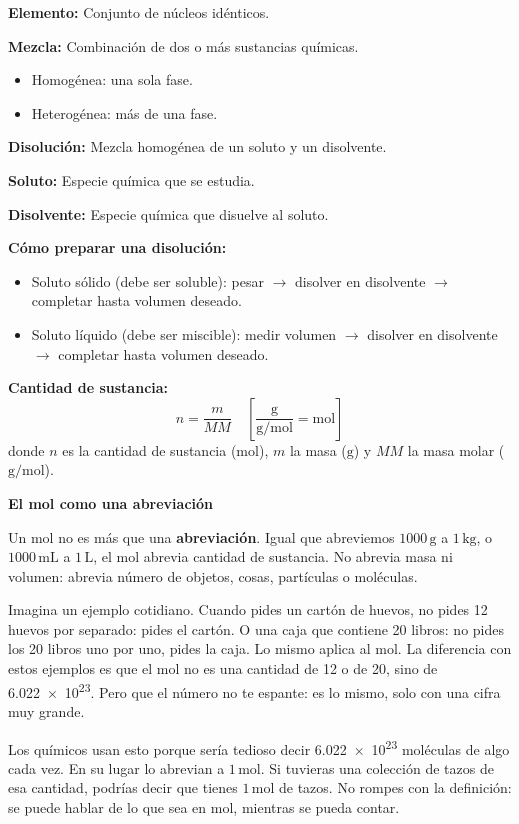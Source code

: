 \textbf{Elemento:} Conjunto de núcleos idénticos.

\textbf{Mezcla:} Combinación de dos o más sustancias químicas.
\begin{itemize}
    \item Homogénea: una sola fase.
    \item Heterogénea: más de una fase.
\end{itemize}

\textbf{Disolución:} Mezcla homogénea de un soluto y un disolvente.

\textbf{Soluto:} Especie química que se estudia.

\textbf{Disolvente:} Especie química que disuelve al soluto.

\textbf{Cómo preparar una disolución:}
\begin{itemize}
    \item Soluto sólido (debe ser soluble): pesar $\to$ disolver en disolvente $\to$ completar hasta volumen deseado.
    \item Soluto líquido (debe ser miscible): medir volumen $\to$ disolver en disolvente $\to$ completar hasta volumen deseado.
\end{itemize}

\textbf{Cantidad de sustancia:}
\begin{equation}
    n = \frac{m}{MM}
    \quad \left[\frac{\mathrm{g}}{\mathrm{g/mol}} = \mathrm{mol}\right]
\end{equation}
donde $n$ es la cantidad de sustancia ($\mathrm{mol}$), $m$ la masa ($\mathrm{g}$) y $MM$ la masa molar ($\mathrm{g/mol}$).

\textbf{El mol como una abreviación}

Un mol no es más que una \textbf{abreviación}. Igual que abreviemos 
$1000\,\mathrm{g}$ a $1\,\mathrm{kg}$, o $1000\,\mathrm{mL}$ a $1\,\mathrm{L}$, 
el mol abrevia cantidad de sustancia. No abrevia masa ni volumen: abrevia 
número de objetos, cosas, partículas o moléculas.

Imagina un ejemplo cotidiano. Cuando pides un cartón de huevos, no pides 12 
huevos por separado: pides el cartón. O una caja que contiene 20 libros: no 
pides los 20 libros uno por uno, pides la caja. Lo mismo aplica al mol. La 
diferencia con estos ejemplos es que el mol no es una cantidad de 12 o de 20, 
sino de \num{6.022e23}. Pero que el número no te espante: es lo mismo, 
solo con una cifra muy grande.

Los químicos usan esto porque sería tedioso decir \num{6.022e23} 
moléculas de algo cada vez. En su lugar lo abrevian a $1\,\mathrm{mol}$. Si 
tuvieras una colección de tazos de esa cantidad, podrías decir que tienes 
$1\,\mathrm{mol}$ de tazos. No rompes con la definición: se puede hablar de lo 
que sea en mol, mientras se pueda contar.

